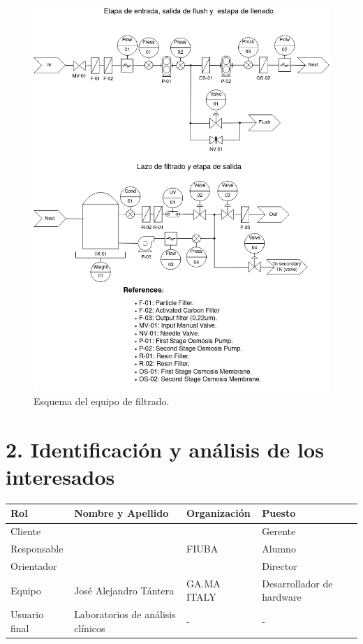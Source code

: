 \documentclass[
11pt, %
]{charter}
\begin{document}
\vspace{25px}
\begin{figure}[htpb]
\centering 
\includegraphics[width=.8\textwidth]{./Figuras/Esquema de equipo_vert.png}
\caption{Esquema del equipo de filtrado.}
\label{fig:equipoEsquemaFisico}
\end{figure}

\vspace{25px}
\newpage
\section{2. Identificación y análisis de los interesados}
\label{sec:interesados}

\begin{table}[ht]
\begin{tabularx}{\linewidth}{@{}|l|X|X|l|@{}}
\hline
\rowcolor[HTML]{C0C0C0} 
Rol           & Nombre y Apellido 		& Organización 		& Puesto 			\\ \hline
Cliente       & \clientename 			&\empclientename 	& Gerente 			\\ \hline
Responsable   & \authorname 			& FIUBA        		& Alumno 			\\ \hline
Orientador    & \supname 				& \pertesupname 	& Director 			\\ \hline
Equipo        & José Alejandro Tántera 	& GA.MA ITALY 		& Desarrollador de hardware    	\\ \hline
Usuario final & Laboratorios de análisis clínicos           &       -       	&      -  	\\ \hline
\end{tabularx}
\end{table}
\end{document}

